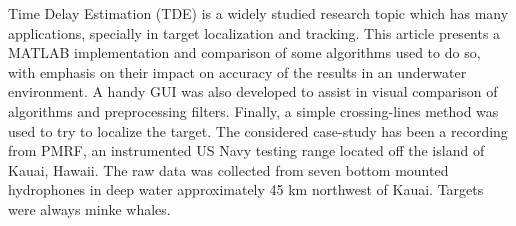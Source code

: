 Time Delay Estimation (TDE) is a widely studied research topic which has many applications, specially in target localization and tracking. This article presents a MATLAB implementation and comparison of some algorithms used to do so, with emphasis on their impact on accuracy of the results in an underwater environment. A handy GUI was also developed to assist in visual comparison of algorithms and preprocessing filters. Finally, a simple crossing-lines method was used to try to localize the target. The considered case-study has been a recording from PMRF, an instrumented US Navy testing range located off the island of Kauai, Hawaii. The raw data was collected from seven bottom mounted hydrophones in deep water approximately 45 km northwest of Kauai. Targets were always minke whales.
